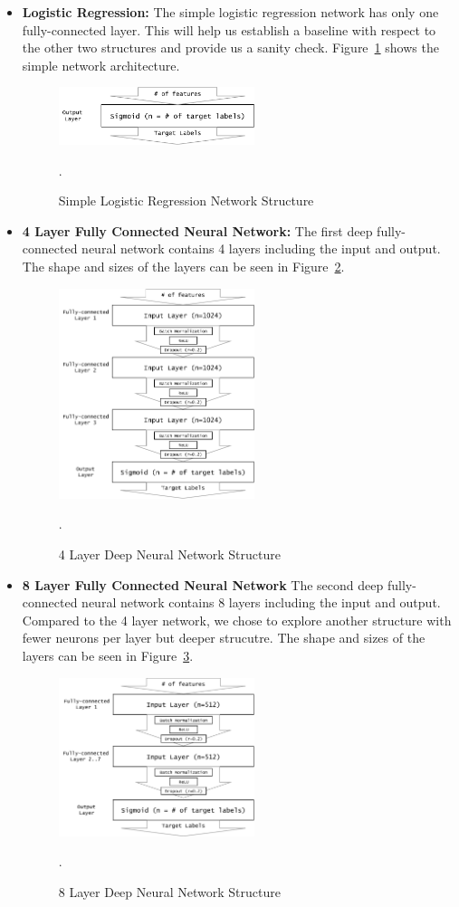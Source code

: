 \documentclass[runningheads,a4paper]{IEEEtran}
\begin{document}
  \begin{itemize}
     \item \textbf{Logistic Regression:} The simple logistic regression network has only one fully-connected layer. This will help us establish a baseline with respect to the other two structures and provide us a sanity check. Figure~\ref{logistic} shows the simple network architecture.
\begin{figure}[h]
\centering
\includegraphics[width=2.25in]{figures/logistic.pdf}
\caption{Simple Logistic Regression Network Structure}
\label{logistic}.
\end{figure}

     \item \textbf{4 Layer Fully Connected Neural Network:} The first deep fully-connected neural network contains 4 layers including the input and output. The shape and sizes of the layers can be seen in Figure~\ref{full4}.
\begin{figure}[h]
\centering
\includegraphics[width=2.25in]{figures/full4.pdf}
\caption{4 Layer Deep Neural Network Structure}
\label{full4}.
\end{figure}

     \item \textbf{8 Layer Fully Connected Neural Network} The second deep fully-connected neural network contains 8 layers including the input and output. Compared to the 4 layer network, we chose to explore another structure with fewer neurons per layer but deeper strucutre. The shape and sizes of the layers can be seen in Figure~\ref{full8}.

\begin{figure}[h]
\centering
\includegraphics[width=2.25in]{figures/full8.pdf}
\caption{8 Layer Deep Neural Network Structure}
\label{full8}.
\end{figure}
  \end{itemize}
\end{document}
